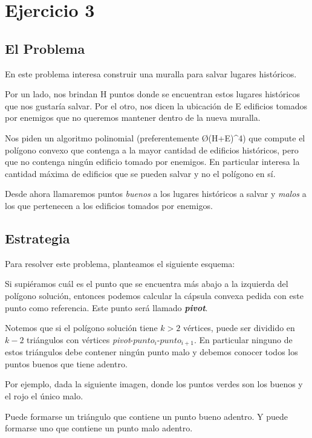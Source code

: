 \section{Ejercicio 3}
\subsection{El Problema}
En este problema interesa construir una muralla para salvar lugares históricos.

Por un lado, nos brindan H puntos donde se encuentran estos lugares históricos que nos gustaría salvar. Por el otro, nos dicen la ubicación de E edificios tomados por enemigos que no queremos mantener dentro de la nueva muralla.

Nos piden un algoritmo polinomial (preferentemente \O{(H+E)^4}) que compute el polígono convexo que contenga a la mayor cantidad de edificios históricos, pero que no contenga ningún edificio tomado por enemigos. En particular interesa la cantidad máxima de edificios que se pueden salvar y no el polígono en sí.

Desde ahora llamaremos puntos \textit{buenos} a los lugares históricos a salvar y \textit{malos} a los que pertenecen a los edificios tomados por enemigos.

\subsection{Estrategia}
Para resolver este problema, planteamos el siguiente esquema:

Si supiéramos cuál es el punto que se encuentra más abajo a la izquierda del polígono solución, entonces podemos calcular la cápsula convexa pedida con este punto como referencia. Este punto será llamado \textit{\textbf{pivot}}.

Notemos que si el polígono solución tiene $k > 2$ vértices, puede ser dividido en $k - 2$ triángulos con vértices \textit{pivot}-$punto_i$-$punto_{i+1}$. En particular ninguno de estos triángulos debe contener ningún punto malo y debemos conocer todos los puntos buenos que tiene adentro.

Por ejemplo, dada la siguiente imagen, donde los puntos verdes son los buenos y el rojo el único malo.


Puede formarse un triángulo que contiene un punto bueno adentro. Y puede formarse uno que contiene un punto malo adentro.


